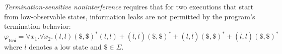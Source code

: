{\em Termination-sensitive noninterference} requires that for two executions 
that
 start from low-observable states, information leaks are not permitted by 
the program's termination behavior:
%
$$
\varphi_{\mathsf{tsni}} = \forall x_1.\forall x_2. (l, l)(\$, \$)^*(l, l)  + 
(\bar{l}, \bar{l})(\$, \$)^* + (l, \bar{l})(\$, \$)^* + (\bar{l}, l)(\$, \$)^*
$$
where $l$ denotes a low state and $\$ \in \Sigma$.

